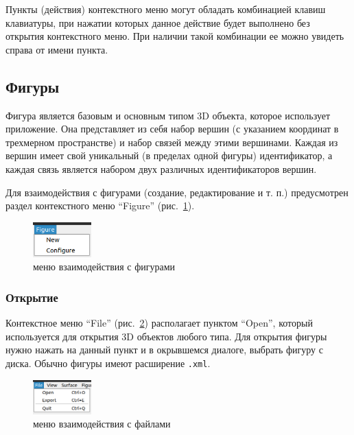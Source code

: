 \documentclass[12pt, a4paper, hidelinks]{article}
\begin{document}
Пункты (действия) контекстного меню могут обладать комбинацией клавиш клавиатуры, при нажатии которых данное действие будет выполнено без открытия контекстного меню. При наличии такой комбинации ее можно увидеть справа от имени пункта.

\subsection{Фигуры}
Фигура является базовым и основным типом 3D объекта, которое использует приложение. Она представляет из себя набор вершин (с указанием координат в трехмерном пространстве) и набор связей между этими вершинами. Каждая из вершин имеет свой уникальный (в пределах одной фигуры) идентификатор, а каждая связь является набором двух различных идентификаторов вершин.

Для взаимодействия с фигурами (создание, редактирование и т. п.) предусмотрен раздел контекстного меню \enquote{Figure} (рис.~\ref{figure_menu}).
\begin{figure}[htbp!]
	\centering
	\includegraphics[width=0.2\textwidth]{images/figuremenu.png}
	\caption{меню взаимодействия с фигурами}
	\label{figure_menu}
\end{figure}

\subsubsection{Открытие}
Контекстное меню \enquote{File} (рис.~\ref{file_menu}) располагает пунктом \enquote{Open}, который используется для открытия 3D объектов любого типа. Для открытия фигуры нужно нажать на данный пункт и в окрывшемся диалоге, выбрать фигуру с диска. Обычно фигуры имеют расширение \verb|.xml|.
\begin{figure}[htbp!]
	\centering
	\includegraphics[width=0.2\textwidth]{images/filemenu.png}
	\caption{меню взаимодействия с файлами}
	\label{file_menu}
\end{figure}
\end{document}

